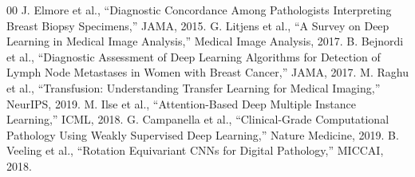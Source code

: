 \documentclass[conference]{IEEEtran}
\begin{document}
\begin{thebibliography}{00}
 J. Elmore et al., ``Diagnostic Concordance Among Pathologists Interpreting Breast Biopsy Specimens,'' JAMA, 2015.
 G. Litjens et al., ``A Survey on Deep Learning in Medical Image Analysis,'' Medical Image Analysis, 2017.
 B. Bejnordi et al., ``Diagnostic Assessment of Deep Learning Algorithms for Detection of Lymph Node Metastases in Women with Breast Cancer,'' JAMA, 2017.
 M. Raghu et al., ``Transfusion: Understanding Transfer Learning for Medical Imaging,'' NeurIPS, 2019.
 M. Ilse et al., ``Attention-Based Deep Multiple Instance Learning,'' ICML, 2018.
 G. Campanella et al., ``Clinical-Grade Computational Pathology Using Weakly Supervised Deep Learning,'' Nature Medicine, 2019.
 B. Veeling et al., ``Rotation Equivariant CNNs for Digital Pathology,'' MICCAI, 2018.
\end{thebibliography}
\end{document}
